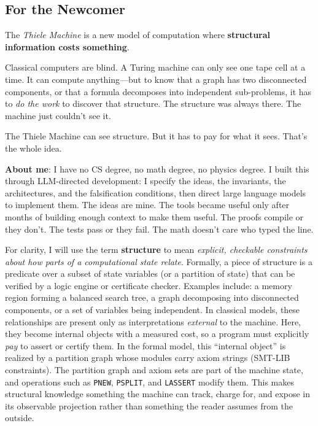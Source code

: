 \subsection{For the Newcomer}

The \textit{Thiele Machine} is a new model of computation where \textbf{structural information costs something}.

Classical computers are blind. A Turing machine can only see one tape cell at a time. It can compute anything---but to know that a graph has two disconnected components, or that a formula decomposes into independent sub-problems, it has to \emph{do the work} to discover that structure. The structure was always there. The machine just couldn't see it.

The Thiele Machine can see structure. But it has to pay for what it sees. That's the whole idea.

\textbf{About me}: I have no CS degree, no math degree, no physics degree. I built this through LLM-directed development: I specify the ideas, the invariants, the architectures, and the falsification conditions, then direct large language models to implement them. The ideas are mine. The tools became useful only after months of building enough context to make them useful. The proofs compile or they don't. The tests pass or they fail. The math doesn't care who typed the line.

For clarity, I will use the term \textbf{structure} to mean \textit{explicit, checkable constraints about how parts of a computational state relate}. Formally, a piece of structure is a predicate over a subset of state variables (or a partition of state) that can be verified by a logic engine or certificate checker. Examples include: a memory region forming a balanced search tree, a graph decomposing into disconnected components, or a set of variables being independent. In classical models, these relationships are present only as interpretations \emph{external} to the machine. Here, they become internal objects with a measured cost, so a program must explicitly \emph{pay} to assert or certify them.
In the formal model, this ``internal object'' is realized by a partition graph whose modules carry axiom strings (SMT-LIB constraints). The partition graph and axiom sets are part of the machine state, and operations such as \texttt{PNEW}, \texttt{PSPLIT}, and \texttt{LASSERT} modify them. This makes structural knowledge something the machine can track, charge for, and expose in its observable projection rather than something the reader assumes from the outside.

